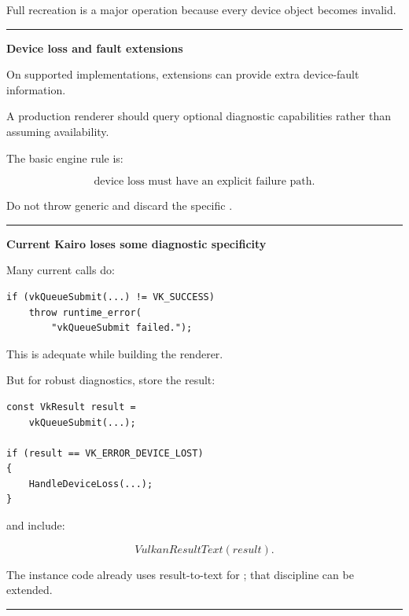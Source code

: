 Full recreation is a major operation because every device object becomes invalid.

\begin{center}\rule{0.5\linewidth}{0.5pt}\end{center}

\textbf{Device loss and fault extensions}

On supported implementations, extensions can provide extra device-fault information.

A production renderer should query optional diagnostic capabilities rather than assuming availability.

The basic engine rule is:

\[
\boxed{
\text{device loss must have an explicit failure path}.
}
\]

Do not throw generic  and discard the specific .

\begin{center}\rule{0.5\linewidth}{0.5pt}\end{center}

\textbf{Current Kairo loses some diagnostic specificity}

Many current calls do:

\begin{verbatim}
if (vkQueueSubmit(...) != VK_SUCCESS)
    throw runtime_error(
        "vkQueueSubmit failed.");
\end{verbatim}

This is adequate while building the renderer.

But for robust diagnostics, store the result:

\begin{verbatim}
const VkResult result =
    vkQueueSubmit(...);

if (result == VK_ERROR_DEVICE_LOST)
{
    HandleDeviceLoss(...);
}
\end{verbatim}

and include:

\[
VulkanResultText(result).
\]

The instance code already uses result-to-text for ; that discipline can be extended.

\begin{center}\rule{0.5\linewidth}{0.5pt}\end{center}

